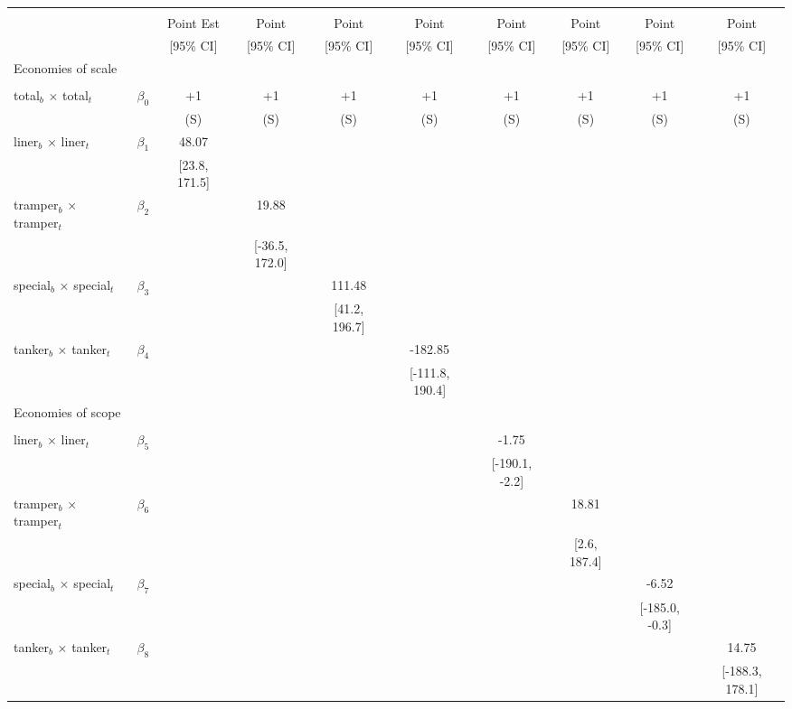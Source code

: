 \begin{tabular}{@{\extracolsep{5pt}}lccccccccc}
\toprule 
 &  &  &  &  &  &  &  &  &  \\
 &  & Point Est & Point & Point & Point & Point & Point & Point & Point \\
 &  & [95\% CI] & [95\% CI] & [95\% CI] & [95\% CI] & [95\% CI] & [95\% CI] & [95\% CI] & [95\% CI] \\
\midrule 
Economies of scale &  &  &  &  &  &  &  \\
 &  &  &  &  &  &  &  &  \\
total$_{b}$ $\times$ total$_{t}$ & $\beta_0$ & +1 & +1 & +1 & +1 & +1 & +1 & +1 & +1 \\
 &  & (S) & (S) & (S) & (S) & (S) & (S) & (S) & (S) \\
liner$_{b}$ $\times$ liner$_{t}$ & $\beta_1$ & 48.07 &  &  &  &  &  &  &  \\
 &  & [23.8, 171.5] &  &  &  &  &  &  &  \\
tramper$_{b}$ $\times$ tramper$_{t}$ & $\beta_2$ &  & 19.88 &  &  &  &  &  &  \\
 &  &  & [-36.5, 172.0] &  &  &  &  &  &  \\
special$_{b}$ $\times$ special$_{t}$ & $\beta_3$ &  &  & 111.48 &  &  &  &  &  \\
 &  &  &  & [41.2, 196.7] &  &  &  &  &  \\
tanker$_{b}$ $\times$ tanker$_{t}$ & $\beta_4$ &  &  &  & -182.85 &  &  &  &  \\
 &  &  &  &  & [-111.8, 190.4] &  &  &  &  \\
Economies of scope &  &  &  &  &  &  &  &  &  \\
 &  &  &  &  &  &  &  &  &  \\
liner$_{b}$ $\times$ liner$_{t}$ & $\beta_5$ &  &  &  &  & -1.75 &  &  &  \\
 &  &  &  &  &  & [-190.1, -2.2] &  &  &  \\
tramper$_{b}$ $\times$ tramper$_{t}$ & $\beta_6$ &  &  &  &  &  & 18.81 &  &  \\
 &  &  &  &  &  &  & [2.6, 187.4] &  &  \\
special$_{b}$ $\times$ special$_{t}$ & $\beta_7$ &  &  &  &  &  &  & -6.52 &  \\
 &  &  &  &  &  &  &  & [-185.0, -0.3] &  \\
tanker$_{b}$ $\times$ tanker$_{t}$ & $\beta_8$ &  &  &  &  &  &  &  & 14.75 \\
 &  &  &  &  &  &  &  &  & [-188.3, 178.1] \\

\end{tabular}
